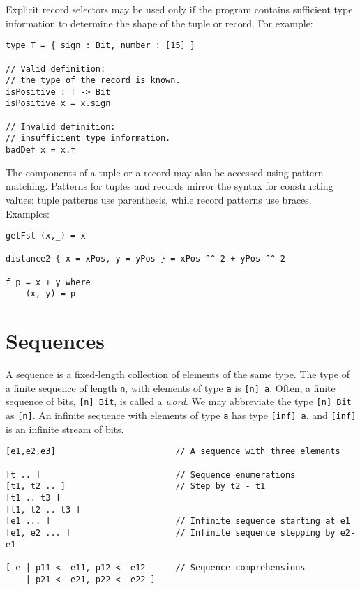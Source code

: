 Explicit record selectors may be used only if the program contains
sufficient type information to determine the shape of the tuple or
record. For example:

\begin{verbatim}
type T = { sign : Bit, number : [15] }

// Valid definition:
// the type of the record is known.
isPositive : T -> Bit
isPositive x = x.sign

// Invalid definition:
// insufficient type information.
badDef x = x.f
\end{verbatim}

The components of a tuple or a record may also be accessed using pattern
matching. Patterns for tuples and records mirror the syntax for
constructing values: tuple patterns use parenthesis, while record
patterns use braces. Examples:

\begin{verbatim}
getFst (x,_) = x

distance2 { x = xPos, y = yPos } = xPos ^^ 2 + yPos ^^ 2

f p = x + y where
    (x, y) = p
\end{verbatim}

\section{Sequences}\label{sequences}

A sequence is a fixed-length collection of elements of the same type.
The type of a finite sequence of length \texttt{n}, with elements of
type \texttt{a} is \texttt{{[}n{]}\ a}. Often, a finite sequence of
bits, \texttt{{[}n{]}\ Bit}, is called a \emph{word}. We may abbreviate
the type \texttt{{[}n{]}\ Bit} as \texttt{{[}n{]}}. An infinite sequence
with elements of type \texttt{a} has type \texttt{{[}inf{]}\ a}, and
\texttt{{[}inf{]}} is an infinite stream of bits.

\begin{verbatim}
[e1,e2,e3]                        // A sequence with three elements

[t .. ]                           // Sequence enumerations
[t1, t2 .. ]                      // Step by t2 - t1
[t1 .. t3 ]
[t1, t2 .. t3 ]
[e1 ... ]                         // Infinite sequence starting at e1
[e1, e2 ... ]                     // Infinite sequence stepping by e2-e1

[ e | p11 <- e11, p12 <- e12      // Sequence comprehensions
    | p21 <- e21, p22 <- e22 ]
\end{verbatim}

